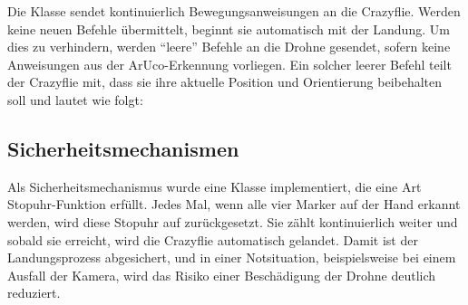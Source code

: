 Die Klasse  sendet kontinuierlich Bewegungsanweisungen an die Crazyflie.
Werden keine neuen Befehle übermittelt, beginnt sie automatisch mit der Landung.
Um dies zu verhindern, werden \enquote{leere} Befehle an die Drohne gesendet, sofern keine Anweisungen aus der ArUco-Erkennung vorliegen.
Ein solcher leerer Befehl teilt der Crazyflie mit, dass sie ihre aktuelle Position und Orientierung beibehalten soll und lautet wie folgt:
\begin{center}
\end{center}

\subsection{Sicherheitsmechanismen}
Als Sicherheitsmechanismus wurde eine Klasse implementiert, die eine Art Stopuhr-Funktion erfüllt.
Jedes Mal, wenn alle vier Marker auf der Hand erkannt werden, wird diese Stopuhr auf  zurückgesetzt.
Sie zählt kontinuierlich weiter und sobald sie  erreicht, wird die Crazyflie automatisch gelandet.
Damit ist der Landungsprozess abgesichert, und in einer Notsituation, beispielsweise bei einem Ausfall der Kamera, wird das Risiko einer Beschädigung der Drohne deutlich reduziert.


\endgroup